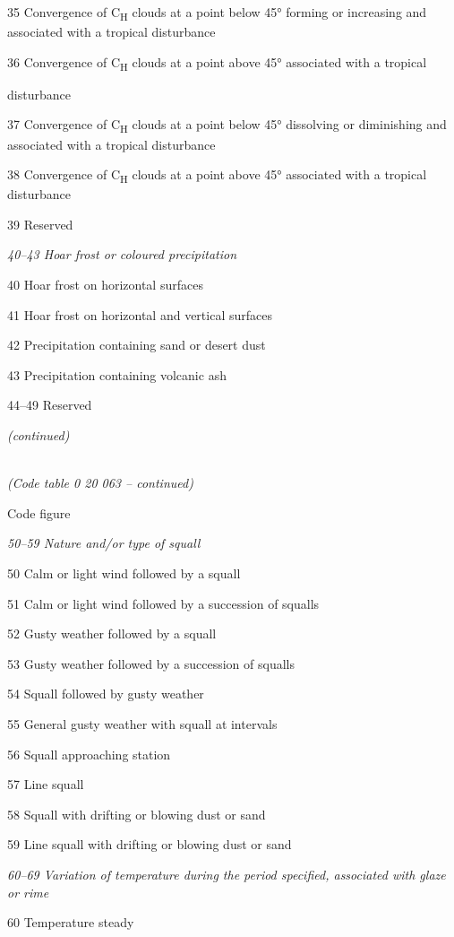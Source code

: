 35 Convergence of C\textsubscript{H} clouds at a point below 45° forming or increasing and associated with a tropical disturbance

36 Convergence of C\textsubscript{H} clouds at a point above 45° associated with a tropical

disturbance

37 Convergence of C\textsubscript{H} clouds at a point below 45° dissolving or diminishing and\\
associated with a tropical disturbance

38 Convergence of C\textsubscript{H} clouds at a point above 45° associated with a tropical disturbance

39 Reserved

\emph{40--43 Hoar frost or coloured precipitation}

40 Hoar frost on horizontal surfaces

41 Hoar frost on horizontal and vertical surfaces

42 Precipitation containing sand or desert dust

43 Precipitation containing volcanic ash

44--49 Reserved

\emph{(continued)}

\emph{\\
(Code table 0 20 063 -- continued)}

Code figure

\emph{50--59 Nature and/or type of squall}

50 Calm or light wind followed by a squall

51 Calm or light wind followed by a succession of squalls

52 Gusty weather followed by a squall

53 Gusty weather followed by a succession of squalls

54 Squall followed by gusty weather

55 General gusty weather with squall at intervals

56 Squall approaching station

57 Line squall

58 Squall with drifting or blowing dust or sand

59 Line squall with drifting or blowing dust or sand

\emph{60--69 Variation of temperature during the period specified, associated with glaze\\
or rime}

60 Temperature steady

